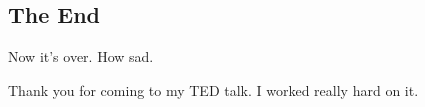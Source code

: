 \documentclass{beamer}
\begin{document}
\subsection{The End}

\begin{frame}
Now it's over.  How sad.

\bigskip

Thank you for coming to my TED talk.  I worked really hard on it.
\end{frame}
\end{document}
